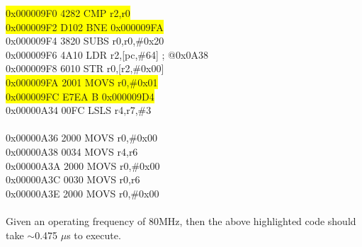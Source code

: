 \documentclass[paper=a4, fontsize=11pt]{scrartcl} %
\numberwithin{equation}{section} %
\numberwithin{figure}{section} %
\numberwithin{table}{section} %
\newcommand{\hl}[1]{\colorbox{yellow}{#1}}
\begin{document}
\begin{enumerate}
		\hl{0x000009F0 4282 CMP r2,r0} \\
		\hl{0x000009F2 D102 BNE 0x000009FA} \\
		0x000009F4 3820 SUBS r0,r0,\#0x20 \\
		0x000009F6 4A10 LDR r2,[pc,\#64] ; @0x0A38 \\
		0x000009F8 6010 STR r0,[r2,\#0x00] \\
		\hl{0x000009FA 2001 MOVS r0,\#0x01} \\
		\hl{0x000009FC E7EA B 0x000009D4} \\
		0x00000A34 00FC LSLS r4,r7,\#3 \\\\
		0x00000A36 2000 MOVS r0,\#0x00 \\
		0x00000A38 0034 MOVS r4,r6 \\
		0x00000A3A 2000 MOVS r0,\#0x00 \\
		0x00000A3C 0030 MOVS r0,r6 \\
		0x00000A3E 2000 MOVS r0,\#0x00\\\\
		Given an operating frequency of 80MHz, then the above highlighted code should take $\sim$0.475 $\mu$s to execute.

\end{enumerate}
\end{document}

